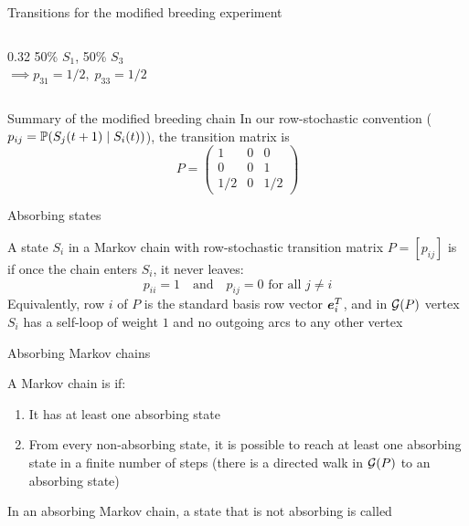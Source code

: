 \documentclass[aspectratio=169]{beamer}\usepackage[]{graphicx}\usepackage[]{xcolor}
\begin{document}
\begin{frame}{Transitions for the modified breeding experiment}
\begin{columns}[T]
\begin{column}{0.32\textwidth}
50\% $S_1$, 50\% $S_3$\\
$\implies p_{31} = 1/2,\; p_{33} = 1/2$
\end{column}
\end{columns}
\end{frame}

\begin{frame}{Summary of the modified breeding chain}
In our row-stochastic convention ($p_{ij} = \mathbb{P}(S_j(t+1) \mid S_i(t))$), the transition matrix is
\[
P = \begin{pmatrix}
1 & 0 & 0 \\
0 & 0 & 1 \\
1/2 & 0 & 1/2
\end{pmatrix}
\]
\vfill
\begin{center}
\end{center}
\end{frame}

\begin{frame}{Absorbing states}
\begin{importantdefinition}
A state $S_i$ in a Markov chain with row-stochastic transition matrix $P = [p_{ij}]$ is  if once the chain enters $S_i$, it never leaves:
\[
p_{ii} = 1 \quad \text{and} \quad p_{ij} = 0 \text{ for all } j \neq i
\]
Equivalently, row $i$ of $P$ is the standard basis row vector $\bm{e}_i^T$, and in $\mathcal{G}(P)$ vertex $S_i$ has a self-loop of weight $1$ and no outgoing arcs to any other vertex
\end{importantdefinition}
\end{frame}

\begin{frame}{Absorbing Markov chains}
\begin{importantdefinition}
A Markov chain is  if:
\begin{enumerate}
\item It has at least one absorbing state
\item From every non-absorbing state, it is possible to reach at least one absorbing state in a finite number of steps (there is a directed walk in $\mathcal{G}(P)$ to an absorbing state)
\end{enumerate}
In an absorbing Markov chain, a state that is not absorbing is called 
\end{importantdefinition}
\end{frame}
\end{document}
